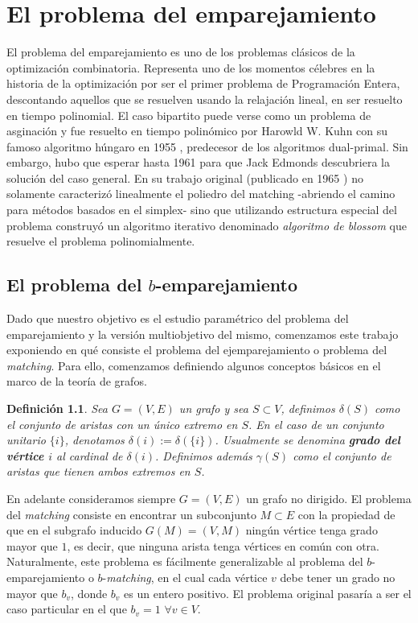 \documentclass[twoside,a4paper,openright,12pt]{book}
\newtheorem{defi}{Definici\'on}[section]
\begin{document}
\chapter{El problema del emparejamiento}
El problema del emparejamiento es uno de los problemas clásicos de la optimización combinatoria. Representa uno de los momentos célebres en la historia de la optimización por ser el primer problema de Programación Entera, descontando aquellos que se resuelven usando la relajación lineal, en ser resuelto en tiempo polinomial. El caso bipartito puede verse como un problema de asginación y fue resuelto en tiempo polinómico por Harowld W. Kuhn con su famoso algoritmo húngaro en 1955 \cite{kuhn}, predecesor de los algoritmos dual-primal. Sin embargo, hubo que esperar hasta 1961 para que Jack Edmonds descubriera la solución del caso general. En su trabajo original (publicado en 1965 \cite{edmond}) no solamente caracterizó linealmente el poliedro del matching -abriendo el camino para métodos basados en el simplex- sino que utilizando estructura especial del problema construyó un algoritmo iterativo denominado \textit{algoritmo de blossom} que resuelve el problema polinomialmente.

\section{El problema del $b$-emparejamiento}
Dado que nuestro objetivo es el estudio paramétrico del problema del emparejamiento y la versión multiobjetivo del mismo, comenzamos este trabajo exponiendo en qué consiste el problema del ejemparejamiento o problema del \textit{matching}. Para ello, comenzamos definiendo algunos conceptos básicos en el marco de la teoría de grafos.
\begin{defi}
Sea $G=(V,E)$ un grafo y sea $S \subset V$, definimos $\delta(S)$ como el conjunto de aristas con un único extremo en $S$. En el caso de un conjunto unitario $\{i\}$, denotamos $\delta(i):=\delta(\{i\})$. Usualmente se denomina \textbf{grado del vértice $i$} al cardinal de $\delta(i)$. Definimos además $\gamma(S)$ como el conjunto de aristas que tienen ambos extremos en $S$.
\end{defi}

En adelante consideramos siempre $G=(V,E)$ un grafo no dirigido. El problema del \textit{matching} consiste en encontrar un subconjunto $M\subset E$ con la propiedad de que en el subgrafo inducido $G(M)=(V,M)$ ningún vértice tenga grado mayor que $1$, es decir, que ninguna arista tenga vértices en común con otra. Naturalmente, este problema es fácilmente generalizable al problema del $b$-emparejamiento o $b$-\textit{matching}, en el cual cada vértice $v$ debe tener un grado no mayor que $b_v$, donde $b_v$ es un entero positivo. El problema original pasaría a ser el caso particular en el que $b_v = 1$ $\forall v \in V$.
\end{document}
